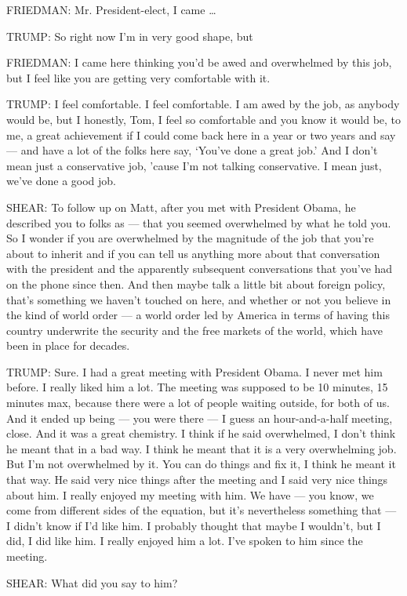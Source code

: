 FRIEDMAN: Mr. President-elect, I came \ldots{}

TRUMP: So right now I'm in very good shape, but

FRIEDMAN: I came here thinking you'd be awed and overwhelmed by this
job, but I feel like you are getting very comfortable with it.

TRUMP: I feel comfortable. I feel comfortable. I am awed by the job, as
anybody would be, but I honestly, Tom, I feel so comfortable and you
know it would be, to me, a great achievement if I could come back here
in a year or two years and say --- and have a lot of the folks here say,
`You've done a great job.' And I don't mean just a conservative job,
'cause I'm not talking conservative. I mean just, we've done a good job.

SHEAR: To follow up on Matt, after you met with President Obama, he
described you to folks as --- that you seemed overwhelmed by what he
told you. So I wonder if you are overwhelmed by the magnitude of the job
that you're about to inherit and if you can tell us anything more about
that conversation with the president and the apparently subsequent
conversations that you've had on the phone since then. And then maybe
talk a little bit about foreign policy, that's something we haven't
touched on here, and whether or not you believe in the kind of world
order --- a world order led by America in terms of having this country
underwrite the security and the free markets of the world, which have
been in place for decades.

TRUMP: Sure. I had a great meeting with President Obama. I never met him
before. I really liked him a lot. The meeting was supposed to be 10
minutes, 15 minutes max, because there were a lot of people waiting
outside, for both of us. And it ended up being --- you were there --- I
guess an hour-and-a-half meeting, close. And it was a great chemistry. I
think if he said overwhelmed, I don't think he meant that in a bad way.
I think he meant that it is a very overwhelming job. But I'm not
overwhelmed by it. You can do things and fix it, I think he meant it
that way. He said very nice things after the meeting and I said very
nice things about him. I really enjoyed my meeting with him. We have ---
you know, we come from different sides of the equation, but it's
nevertheless something that --- I didn't know if I'd like him. I
probably thought that maybe I wouldn't, but I did, I did like him. I
really enjoyed him a lot. I've spoken to him since the meeting.

SHEAR: What did you say to him?

